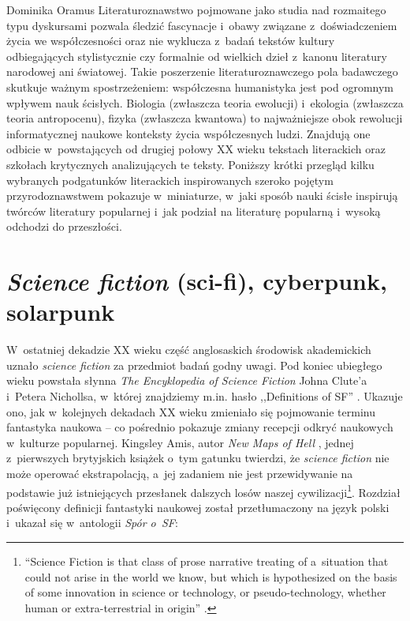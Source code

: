 \begin{artplenv}{Dominika Oramus}
\lettrine[loversize=0.13,lines=2,lraise=-0.01,nindent=0em,findent=0.2pt]%
{L}{}iteraturoznawstwo pojmowane jako studia nad rozmaitego typu dyskursami pozwala śledzić fascynacje i~obawy związane z~doświadczeniem życia we współczesności oraz nie wyklucza z~badań tekstów kultury odbiegających stylistycznie czy formalnie od wielkich dzieł z~kanonu literatury narodowej ani światowej. Takie poszerzenie literaturoznawczego pola badawczego skutkuje ważnym spostrzeżeniem: współczesna humanistyka jest pod ogromnym wpływem nauk ścisłych. Biologia (zwłaszcza teoria ewolucji) i~ekologia (zwłaszcza teoria antropocenu), fizyka (zwłaszcza kwantowa) to najważniejsze obok rewolucji informatycznej naukowe konteksty życia współczesnych ludzi. Znajdują one odbicie w~powstających od drugiej połowy XX wieku tekstach literackich oraz szkołach krytycznych analizujących te teksty. Poniższy krótki przegląd kilku wybranych podgatunków literackich inspirowanych szeroko pojętym przyrodoznawstwem pokazuje w~miniaturze, w~jaki sposób nauki ścisłe inspirują twórców literatury popularnej i~jak podział na literaturę popularną i~wysoką odchodzi do przeszłości.

\section*{\textit{Science fiction} (sci-fi), cyberpunk, solarpunk}
W~ostatniej dekadzie XX wieku część anglosaskich środowisk akademickich uznało \textit{science fiction} za przedmiot badań godny uwagi. Pod koniec ubiegłego wieku powstała słynna \textit{The Encyklopedia of Science Fiction} Johna Clute’a i~Petera Nichollsa, w~której znajdziemy m.in. hasło ,,Definitions of SF''
\parencite[][s.~311–314]{clute_encyclopedia_1993}. %
 Ukazuje ono, jak w~kolejnych dekadach XX wieku zmieniało się pojmowanie terminu fantastyka naukowa -- co pośrednio pokazuje zmiany recepcji odkryć naukowych w~kulturze popularnej. Kingsley Amis, autor \textit{New Maps of Hell} 
\parencite*[][]{amis_new_1960}, %
 jednej z~pierwszych brytyjskich książek o~tym gatunku twierdzi, że \textit{science fiction} nie może operować ekstrapolacją, a~jej zadaniem nie jest przewidywanie na podstawie już istniejących przesłanek dalszych losów naszej cywilizacji\footnote{“Science Fiction is that class of prose narrative treating of a~situation that could not arise in the world we know, but which is hypothesized on the basis of some innovation in science or technology, or pseudo-technology, whether human or extra-terrestrial in origin'' 
\parencite[][s.~14]{amis_new_1960}.%
}. Rozdział poświęcony definicji fantastyki naukowej został przetłumaczony na język polski i~ukazał się w~antologii \textit{Spór o~SF}:


\end{artplenv}
